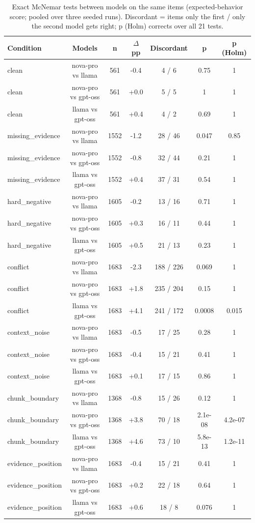 \begin{table}[t]
\centering\small
\caption{Exact McNemar tests between models on the same items (expected-behavior score; pooled over three seeded runs). Discordant = items only the first / only the second model gets right; p (Holm) corrects over all 21 tests.}
\begin{tabular}{lcccccc}
\toprule
Condition & Models & n & $\Delta$ pp & Discordant & p & p (Holm) \\
\midrule
clean & nova-pro vs llama & 561 & -0.4 & 4 / 6 & 0.75 & 1 \\
clean & nova-pro vs gpt-oss & 561 & +0.0 & 5 / 5 & 1 & 1 \\
clean & llama vs gpt-oss & 561 & +0.4 & 4 / 2 & 0.69 & 1 \\
missing\_evidence & nova-pro vs llama & 1552 & -1.2 & 28 / 46 & 0.047 & 0.85 \\
missing\_evidence & nova-pro vs gpt-oss & 1552 & -0.8 & 32 / 44 & 0.21 & 1 \\
missing\_evidence & llama vs gpt-oss & 1552 & +0.4 & 37 / 31 & 0.54 & 1 \\
hard\_negative & nova-pro vs llama & 1605 & -0.2 & 13 / 16 & 0.71 & 1 \\
hard\_negative & nova-pro vs gpt-oss & 1605 & +0.3 & 16 / 11 & 0.44 & 1 \\
hard\_negative & llama vs gpt-oss & 1605 & +0.5 & 21 / 13 & 0.23 & 1 \\
conflict & nova-pro vs llama & 1683 & -2.3 & 188 / 226 & 0.069 & 1 \\
conflict & nova-pro vs gpt-oss & 1683 & +1.8 & 235 / 204 & 0.15 & 1 \\
conflict & llama vs gpt-oss & 1683 & +4.1 & 241 / 172 & 0.0008 & 0.015 \\
context\_noise & nova-pro vs llama & 1683 & -0.5 & 17 / 25 & 0.28 & 1 \\
context\_noise & nova-pro vs gpt-oss & 1683 & -0.4 & 15 / 21 & 0.41 & 1 \\
context\_noise & llama vs gpt-oss & 1683 & +0.1 & 17 / 15 & 0.86 & 1 \\
chunk\_boundary & nova-pro vs llama & 1368 & -0.8 & 15 / 26 & 0.12 & 1 \\
chunk\_boundary & nova-pro vs gpt-oss & 1368 & +3.8 & 70 / 18 & 2.1e-08 & 4.2e-07 \\
chunk\_boundary & llama vs gpt-oss & 1368 & +4.6 & 73 / 10 & 5.8e-13 & 1.2e-11 \\
evidence\_position & nova-pro vs llama & 1683 & -0.4 & 15 / 21 & 0.41 & 1 \\
evidence\_position & nova-pro vs gpt-oss & 1683 & +0.2 & 22 / 18 & 0.64 & 1 \\
evidence\_position & llama vs gpt-oss & 1683 & +0.6 & 18 / 8 & 0.076 & 1 \\
\bottomrule
\end{tabular}
\end{table}

